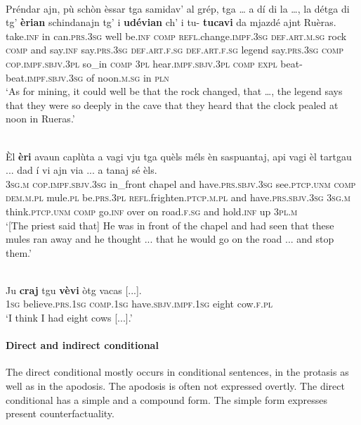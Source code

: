 \ea
\label{ex:subjimpf1}
\\
\gll Préndar ajn, pù schòn èssar tga samidav’ al grép, tga …  a dí di la …, la détga di tg’ \textbf{èrian} schindanajn tg' i \textbf{udévian} ch’ i tu- \textbf{tucavi} da mjazdé ajnt Ruèras.\\
take.\textsc{inf} in can.\textsc{prs.3sg} well be.\textsc{inf}  \textsc{comp} \textsc{refl}.change.\textsc{impf.3sg} \textsc{def.art.m.sg} rock \textsc{comp} {} and say.\textsc{inf} say.\textsc{prs.3sg} \textsc{def.art.f.sg} {} \textsc{def.art.f.sg} legend say.\textsc{prs.3sg}  \textsc{comp} \textsc{cop.impf.sbjv.3pl} so\_in \textsc{comp} \textsc{3pl} hear.\textsc{impf.sbjv.3pl} \textsc{comp} \textsc{expl} beat- beat.\textsc{impf.sbjv.3sg} of noon.\textsc{m.sg} in \textsc{pln}\\
\glt `As for mining, it could well be that the rock changed, that …, the legend says that they were so deeply in the cave that they heard that the clock pealed at noon in Rueras.'
\z

\ea\label{ex:subjimpf2}
\\
\gll  Èl \textbf{èri} avaun caplùta a vagi vju tga quèls méls èn saspuantaj, api vagi èl tartgau ... dad í vi ajn via ... a tanaj sé èls.  \\
\textsc{3sg.m} \textsc{cop.impf.sbjv.3sg} in\_front chapel and have.\textsc{prs.sbjv.3sg} see.\textsc{ptcp.unm} \textsc{comp} \textsc{dem.m.pl} mule.\textsc{pl} be.\textsc{prs.3pl} \textsc{refl.}frighten.\textsc{ptcp.m.pl} and have.\textsc{prs.sbjv.3sg} \textsc{3sg.m} think.\textsc{ptcp.unm} {} \textsc{comp} go.\textsc{inf} over on road.\textsc{f.sg} {} and hold.\textsc{inf} up \textsc{3pl.m}\\
\glt `[The priest said that] He was in front of the chapel and had seen that these mules ran away and he thought ... that he would go on the road ... and stop them.'
\z

\ea
\label{ex:subjimpf3}
\\
\gll Ju \textbf{craj} tgu \textbf{vèvi} òtg vacas [...].\\
\textsc{1sg} believe.\textsc{prs.1sg} \textsc{comp.1sg} have.\textsc{sbjv.impf.1sg} eight cow.\textsc{f.pl}\\
\glt `I think I had eight cows [...].'
\z

\paragraph{Direct and indirect conditional}
The direct conditional mostly occurs in conditional sentences, in the protasis as well as in the apodosis. The apodosis is often not expressed overtly. The direct conditional has a simple and a compound form. The simple form expresses present counterfactuality.

